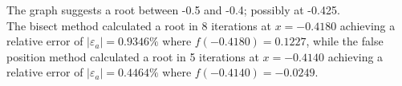 \documentclass{article}
\begin{document}
The graph suggests a root between -0.5 and -0.4; possibly at -0.425.\\

The bisect method calculated a root in 8 iterations at $x=-0.4180$ achieving a relative error of $\left| \varepsilon_{a} \right| =0.9346\%$ where $f(-0.4180)=0.1227$, while the false position method calculated a root in 5 iterations at $x=-0.4140$ achieving a relative error of $\left| \varepsilon_{a} \right| =0.4464\%$  where $f(-0.4140)=-0.0249$.
\end{document}
